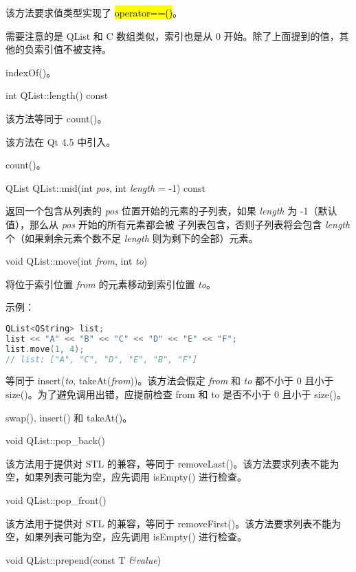 该方法要求值类型实现了 \hl{operator==()}。

需要注意的是 QList 和 C 数组类似，索引也是从 0 开始。除了上面提到的值，其他的负索引值不被支持。


\begin{notice}[另请参阅]
indexOf()。
\end{notice}


int QList::length() const

该方法等同于 count()。

该方法在 Qt 4.5 中引入。


\begin{notice}[另请参阅]
count()。
\end{notice}


QList QList::mid(int \emph{pos}, int \emph{length} = -1) const

返回一个包含从列表的 \emph{pos} 位置开始的元素的子列表，如果
\emph{length} 为 -1（默认值），那么从 \emph{pos} 开始的所有元素都会被
子列表包含，否则子列表将会包含 \emph{length} 个（如果剩余元素个数不足 \emph{length} 则为剩下的全部）元素。

void QList::move(int \emph{from}, int \emph{to})

将位于索引位置 \emph{from} 的元素移动到索引位置 \emph{to}。

示例：


\begin{lstlisting}[language=C++]
QList<QString> list;
list << "A" << "B" << "C" << "D" << "E" << "F";
list.move(1, 4);
// list: ["A", "C", "D", "E", "B", "F"]
\end{lstlisting}

等同于 insert(\emph{to}, takeAt(\emph{from}))。该方法会假定 \emph{from} 和 \emph{to} 都不小于 0 且小于 size()。为了避免调用出错，应提前检查 from 和 to 是否不小于 0 且小于 size()。

\begin{notice}[另请参阅]
swap(), insert() 和 takeAt()。
\end{notice}

void QList::pop\_back()

该方法用于提供对 STL 的兼容，等同于 removeLast()。该方法要求列表不能为空，如果列表可能为空，应先调用 isEmpty() 进行检查。

void QList::pop\_front()

该方法用于提供对 STL 的兼容，等同于 removeFirst()。该方法要求列表不能为空，如果列表可能为空，应先调用 isEmpty() 进行检查。

void QList::prepend(const T \emph{\&value})

